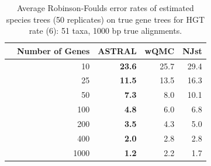 \begin{table}[h!]
\caption[Error rates of estimated species trees (50 replicates)  on true gene trees for HGT rate 6]{Average Robinson-Foulds error rates of estimated
species  trees (50 replicates) on true gene trees for HGT rate 
(6): 51 taxa, 1000 bp true alignments. }
\begin{tabular}{rrrrr}
 & Number of Genes & ASTRAL & wQMC   & NJst\\
\hline
 & 10 & \textbf{23.6} & 25.7   & 29.4\\
 & 25 & \textbf{11.5} & 13.5   & 16.3\\
 & 50 & \textbf{7.3} & 8.0 &   10.1\\
 & 100 & \textbf{4.8} & 6.0 &   6.8\\
 & 200 & \textbf{3.5} & 4.3 &   5.0\\
 & 400 & \textbf{2.0} & 2.8 &   2.8\\
 & 1000 & \textbf{1.2} & 2.2 &   1.7\\
\end{tabular}
\label{hgt::table12}
\end{table}

